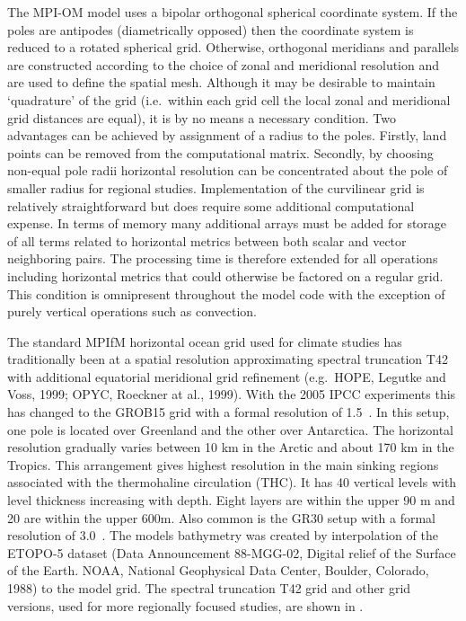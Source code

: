 The \mbox{MPI-OM} model uses a bipolar orthogonal spherical coordinate system.
If the poles are antipodes (diametrically opposed) then the coordinate system
is reduced to a rotated spherical grid.
Otherwise, orthogonal meridians and parallels are constructed
according to the choice of zonal and meridional resolution and are used to define the spatial mesh.
Although it may be desirable to maintain `quadrature' of the grid
(i.e.\ within each grid cell the local zonal and meridional grid distances are equal),
it is by no means a necessary condition.
Two advantages can be achieved by assignment of a radius to the poles.
Firstly, land points can be removed from the computational matrix.
Secondly, by choosing non-equal pole radii horizontal resolution can be
concentrated about the pole of smaller radius for regional studies.
Implementation of the curvilinear grid is relatively straightforward
but does require 
some additional computational expense.
In terms of memory many additional arrays must be added for storage of all terms
related to horizontal metrics between both scalar and vector neighboring pairs.
The processing time is therefore extended for all operations including horizontal metrics
that could otherwise be factored on a regular grid.
This condition is omnipresent throughout the model code with the exception of purely vertical
operations such as convection.

The standard MPIfM horizontal ocean grid used for climate studies has traditionally been at a spatial resolution
approximating spectral truncation T42 with additional equatorial meridional grid refinement
(e.g.\ HOPE, Legutke and Voss, 1999; OPYC, Roeckner at al., 1999). \nocite{legutke99,roeckner99}
With the 2005 IPCC experiments this has changed to the GROB15 grid with a formal
resolution of 1.5~\degs. In this setup,
one pole is located over Greenland and the other over Antarctica.
The horizontal resolution gradually varies between 10 km in the Arctic
and about 170 km in the Tropics. This arrangement gives highest resolution in the 
main sinking regions associated with the thermohaline circulation (THC).
It has 40 vertical levels with level
thickness increasing with depth. Eight layers are within the upper 90 m
and 20 are within the upper 600m. Also common is the GR30 setup with a formal
resolution of 3.0~\degs.
The models bathymetry was created by interpolation of the
ETOPO-5 dataset (Data Announcement 88-MGG-02, Digital relief of the
Surface of the Earth. NOAA, National Geophysical Data Center, Boulder,
Colorado, 1988) to the model grid.
The spectral truncation T42 grid and other grid versions, 
used for more regionally focused studies, are shown in \citet{Marsland:2003}.



